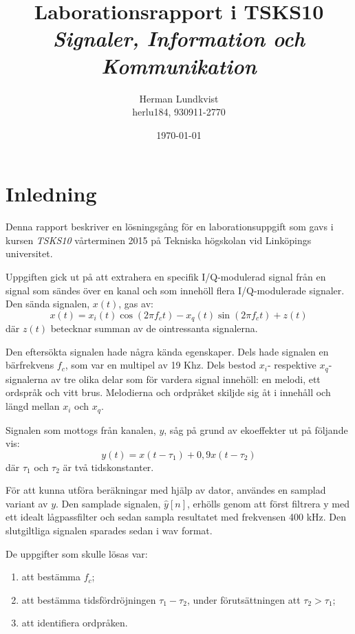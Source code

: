 \documentclass[10pt,twocolumn]{article}
\title{Laborationsrapport i TSKS10 \emph{Signaler, Information och Kommunikation}}
\author{Herman Lundkvist \\ herlu184, 930911-2770 }
\date{\today}
\begin{document}
\newcommand{\yhat}{$\hat{y}[n]$\xspace}



\maketitle

\section{Inledning}

Denna rapport beskriver en lösningsgång för en laborationsuppgift som gavs i
kursen \emph{TSKS10} vårterminen 2015 på Tekniska högskolan vid Linköpings
universitet.

Uppgiften gick ut på att extrahera en specifik I/Q-modulerad signal från en signal som sändes
över en kanal och som innehöll flera I/Q-modulerade signaler. Den sända signalen, $x(t)$, gas av:
\begin{equation}
x(t) = x_i(t) \cos(2 \pi f_ct) - x_q(t) \sin(2 \pi f_c t) + z(t)
\label{e1}
\end{equation}
där $z(t)$ betecknar summan av de ointressanta signalerna.

Den eftersökta signalen hade några kända egenskaper. Dels hade signalen en
bärfrekvens $f_c$, som var en multipel av 19 Khz. Dels bestod $x_i$- respektive
$x_q$-signalerna av tre olika delar som för vardera signal innehöll: en melodi, ett ordspråk
och vitt brus. Melodierna och ordpråket skiljde sig åt i
innehåll och längd mellan $x_i$ och $x_q$.

Signalen som mottogs från kanalen, $y$, såg på grund av ekoeffekter ut på
följande vis:
\begin{equation}
    y(t)=x(t - \tau_1) + 0,9 x(t - \tau_2)
\end{equation}
där $\tau_1$ och $\tau_2$ är två tidskonstanter.

För att kunna utföra beräkningar med hjälp av dator, användes en samplad
variant av $y$. Den samplade signalen, \yhat, erhölls genom att först
filtrera y med ett idealt lågpassfilter och sedan sampla resultatet med
frekvensen 400 kHz. Den slutgiltliga signalen sparades sedan i wav format.

De uppgifter som skulle lösas var:
\begin{enumerate}
\item att bestämma $f_c$;
\item att bestämma tidsfördröjningen $\tau_1-\tau_2$, under förutsättningen att
$\tau_2 > \tau_1$;
\item att identifiera ordpråken.
\end{enumerate}
\end{document}
